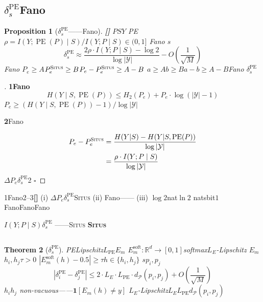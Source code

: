 \documentclass[11pt,a4paper]{article}
\newtheorem{theorem}{Theorem}[section]
\newtheorem{proposition}[theorem]{Proposition}
\theoremstyle{remark}
\DeclareMathOperator{\PE}{PE}
\newcommand{\R}{\mathbb{R}}
\newcommand{\Y}{\mathcal{Y}}
\newcommand{\Ppos}{\mathcal{P}}
\newcommand{\Situs}{\textsc{Situs}}
\newcommand{\heuristic}{\textnormal{\textbf{[]}}}
\begin{document}
\subsection{$\delta_s^{\PE}$Fano}

\begin{proposition}[$\delta_s^{\PE}$——Fano]
\label{prop:2.4.1}
\heuristic{} \textbf{}$P$$S$$Y$
PE$\rho = I(Y; \PE(P) \mid S) / I(Y; P \mid S) \in (0, 1]$
Fano
$s$
\begin{equation}
    \delta_s^{\PE} \approx \frac{2\rho \cdot I(Y; P \mid S) - \log 2}{\log |\Y|}
    - O\!\left(\frac{1}{\sqrt{M}}\right)
\end{equation}
\textbf{}\textbf{}Fano
$P_e \geq A$$P_e^{\Situs} \geq B$$P_e - P_e^{\Situs} \geq A - B$
$a \geq A$$b \geq B$$a-b \geq A-B$Fano
$\delta_s^{\PE}$\textbf{}

\end{proposition}

\begin{proof}[]
\textbf{1Fano}
\begin{equation}
    H(Y \mid S, \PE(P)) \leq H_2(P_e) + P_e \cdot \log(|\Y| - 1)
\end{equation}
$P_e \geq (H(Y \mid S, \PE(P)) - 1) / \log |\Y|$

\textbf{2}Fano

\begin{align}
    P_e - P_e^{\Situs}
    &\stackrel{\text{}}{=} \frac{H(Y|S) - H(Y|S, \PE(P))}{\log |\Y|} \nonumber\\
    &= \frac{\rho \cdot I(Y; P \mid S)}{\log |\Y|}
\end{align}
$\Delta P_e$$\delta_s^{\PE}$2
\textbf{}\hfill $\square$
\end{proof}

\textbf{}1Fano2--3\heuristic{}
(i) $\Delta P_e$$\delta_s^{\PE}$\Situs{}
(ii) Fano——
(iii) $\log 2$nat$\ln 2$ natsbit$1$
FanoFanoFano

\textbf{}$I(Y; P \mid S)$$\delta_s^{\PE}$
——\Situs{}\textbf{
\Situs{}}

\subsection{}

\begin{theorem}[$\delta_s^{\PE}$]
\label{thm:2.5.1}
PELipschitz$L_{\PE}$$E_m$\textbf{}
$E_m^{\text{soft}}: \R^d \to [0,1]$softmax$L_E$-Lipschitz
\textbf{}$E_m$$h_i, h_j$$\tau > 0$
$|E_m^{\text{soft}}(h) - 0.5| \geq \tau$$h \in \{h_i, h_j\}$
$s$$p_i, p_j$
\begin{equation}
    \boxed{
    |\delta_i^{\PE} - \delta_j^{\PE}|
    \leq 2 \cdot L_E \cdot L_{\PE} \cdot d_{\Ppos}(p_i, p_j)
    + O\!\left(\frac{1}{\sqrt{M}}\right)
    }
\end{equation}
\textbf{}$h_i$$h_j$
non-vacuous——$\mathbf{1}[E_m(h) \neq y]$
$L_E$-Lipschitz$L_E L_{\PE} d_{\Ppos}(p_i, p_j)$
\end{theorem}
\end{document}
